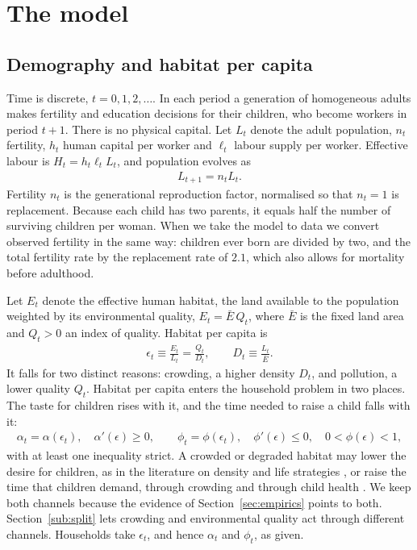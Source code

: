 \documentclass[11pt]{article}
\begin{document}
\section{The model}
\label{sec:model}
\label{sec:habitat_taste}

\subsection{Demography and habitat per capita}
Time is discrete, $t=0,1,2,\dots$. In each period a generation of homogeneous adults makes fertility
and education decisions for their children, who become workers in period $t+1$. There is no physical
capital. Let $L_t$ denote the adult population, $n_t$ fertility, $h_t$ human capital per worker and
$\ell_t$ labour supply per worker. Effective labour is $H_t=h_t\ell_tL_t$, and population evolves as
\begin{align}
L_{t+1}=n_tL_t .
\label{eq:Llaw_hab}
\end{align}
Fertility $n_t$ is the generational reproduction factor, normalised so that $n_t=1$ is replacement.
Because each child has two parents, it equals half the number of surviving children per woman. When we
take the model to data we convert observed fertility in the same way: children ever born are divided by
two, and the total fertility rate by the replacement rate of $2.1$, which also allows for mortality
before adulthood.

Let $E_t$ denote the effective human habitat, the land available to the population weighted by its
environmental quality, $E_t=\bar E\,Q_t$, where $\bar E$ is the fixed land area and $Q_t>0$ an index of
quality. Habitat per capita is
\begin{align}
\epsilon_t\equiv\frac{E_t}{L_t}=\frac{Q_t}{D_t},
\qquad D_t\equiv\frac{L_t}{\bar E}.
\label{eq:eps_def}
\end{align}
It falls for two distinct reasons: crowding, a higher density $D_t$, and pollution, a lower quality
$Q_t$. Habitat per capita enters the household problem in two places. The taste for children rises
with it, and the time needed to raise a child falls with it:
\begin{align}
\alpha_t=\alpha(\epsilon_t),\quad \alpha'(\epsilon)\ge0,
\qquad
\phi_t=\phi(\epsilon_t),\quad \phi'(\epsilon)\le0,\quad 0<\phi(\epsilon)<1,
\label{eq:alpha_eps}
\end{align}
with at least one inequality strict. A crowded or degraded habitat may lower the desire for children,
as in the literature on density and life strategies \citep{lutz2006,sng2017}, or raise the time that children demand, through crowding \citep{DAO2013442,dao25} and through child
health \citep{mari10,Varvarigos2013}. We keep both channels
because the evidence of Section~\ref{sec:empirics} points to both. Section~\ref{sub:split} lets crowding
and environmental quality act through different channels. Households take $\epsilon_t$, and hence
$\alpha_t$ and $\phi_t$, as given.
\end{document}
